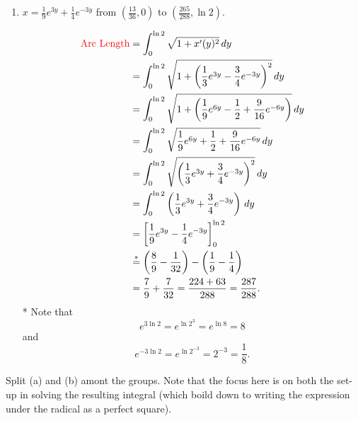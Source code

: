 \documentclass[handout,instructornotes]{ximera}
\begin{document}
\begin{problem}
\begin{enumerate}
		\item  $x = \frac{1}{9} e^{3y} + \frac{1}{4} e^{-3y}$ from $\left( \frac{13}{36}, 0 \right)$ to $\left( \frac{265}{288}, \ln 2 \right)$.  
		\begin{freeResponse}
			\begin{align*}
			\text{{\color{red} Arc Length}} &= \int_0^{\ln 2} \sqrt{1+x'(y)^2} \,d y  \\
			&=\int_0^{\ln 2} \sqrt{1+ \left( \frac{1}{3}e^{3y} - \frac{3}{4}e^{-3y} \right)^2} \,d y  \\
			&=  \int_0^{\ln 2} \sqrt{1+ \left( \frac{1}{9}e^{6y} - \frac{1}{2} + \frac{9}{16}e^{-6y} \right)} \,d y  \\
			&= \int_0^{\ln 2} \sqrt{ \frac{1}{9}e^{6y} + \frac{1}{2} + \frac{9}{16}e^{-6y} } \,d y  \\
			&= \int_0^{\ln 2} \sqrt{ \left( \frac{1}{3}e^{3y} + \frac{3}{4}e^{-3y} \right)^2} \,d y  \\
			&= \int_0^{\ln 2} \left( \frac{1}{3}e^{3y} + \frac{3}{4}e^{-3y} \right) \,d y  \\
			&= \bigg[  \frac{1}{9}e^{3y} - \frac{1}{4}e^{-3y} \bigg]_0^{\ln 2}  \\
			&\overset{*}{=} \left( \frac{8}{9} - \frac{1}{32} \right) - \left( \frac{1}{9} - \frac{1}{4} \right)  \\
			&= \frac{7}{9} + \frac{7}{32} = \frac{224 + 63}{288} = \frac{287}{288}.
			\end{align*}
		* Note that
			\[
			e^{3 \ln 2} = e^{\ln 2^3} = e^{\ln 8} = 8
			\]
	and
			\[
			e^{-3 \ln 2} = e^{\ln 2^{-3}} = 2^{-3} = \frac{1}{8}.
			\]
		\end{freeResponse}
		
	\end{enumerate}

\end{problem}

\begin{instructorNotes}
Split (a) and (b) amont the groups.  
Note that the focus here is on both the set-up  in solving the resulting integral (which boild down to writing the expression under the radical as a perfect square).
\end{instructorNotes}


















	
	
	
	
	
	
	
	
	

	










								
				
				
	
\end{document}

